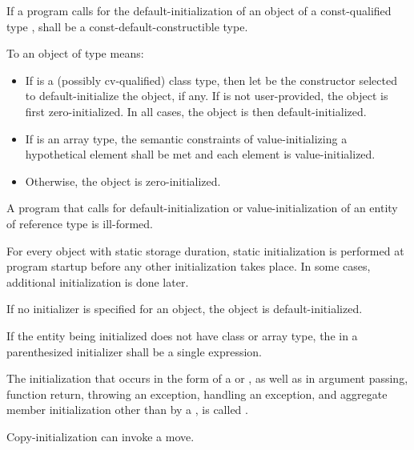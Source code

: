If a program calls for the default-initialization of an object of a
const-qualified type ,
 shall be a const-default-constructible type.

\pnum
To
an object of type
means:

\begin{itemize}
\item
If
is a (possibly cv-qualified) class type, then
let  be the constructor selected to
default-initialize the object, if any.
If  is not user-provided, the object is first zero-initialized.
In all cases, the object is then default-initialized.

\item
If
is an array type,
the semantic constraints of value-initializing a hypothetical element
shall be met and
each element is value-initialized.

\item
Otherwise, the object is zero-initialized.
\end{itemize}

\pnum
A program that calls for default-initialization
or value-initialization
of an entity
of reference type is ill-formed.

\pnum
\begin{note}
For every object with static storage duration,
static initialization is performed
at program startup before any other initialization takes place.
In some cases, additional initialization is done later.
\end{note}

\pnum
If no initializer is specified for an object, the object is default-initialized.

\pnum
If the entity being initialized does not have class or array type, the
 in a
parenthesized initializer shall be a single expression.

\pnum
{}%
%
The initialization that occurs in the \tcode{=} form of a
 or
,
as well as in argument passing, function return,
throwing an exception,
handling an exception,
and aggregate member initialization other than by a
,
is called
.
\begin{note}
Copy-initialization can invoke a move.
\end{note}

